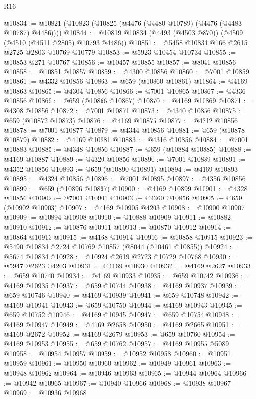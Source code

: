 \begin{lexlean}{R16}
\begin{coremodule}
@10834 := @10821 (@10823 (@10825 (@4476 (@4480 @10789) (@4476 (@4483 @10787) @4486))))
@10844 := @10819 @10834 (@4493 (@4503 @870)) (@4509 (@4510 (@4511 @2805) @10793 @4486))
@10851 := @5458 @10834 @166 @2615 @2725 @2803 @10769 @10779
@10853 := @5923 @10454 @10734
@10855 := @10853 @271 @10767
@10856 := @10457 @10855
@10857 := @8041 @10856
@10858 := @10851 @10857
@10859 := @4300 @10856
@10860 := @7001 @10859
@10861 := @4332 @10856
@10863 := @659 (@10860 @10861)
@10864 := @4169 @10863
@10865 := @4304 @10856
@10866 := @7001 @10865
@10867 := @4336 @10856
@10869 := @659 (@10866 @10867)
@10870 := @4169 @10869
@10871 := @4308 @10856
@10872 := @7001 @10871
@10873 := @4340 @10856
@10875 := @659 (@10872 @10873)
@10876 := @4169 @10875
@10877 := @4312 @10856
@10878 := @7001 @10877
@10879 := @4344 @10856
@10881 := @659 (@10878 @10879)
@10882 := @4169 @10881
@10883 := @4316 @10856
@10884 := @7001 @10883
@10885 := @4348 @10856
@10887 := @659 (@10884 @10885)
@10888 := @4169 @10887
@10889 := @4320 @10856
@10890 := @7001 @10889
@10891 := @4352 @10856
@10893 := @659 (@10890 @10891)
@10894 := @4169 @10893
@10895 := @4324 @10856
@10896 := @7001 @10895
@10897 := @4356 @10856
@10899 := @659 (@10896 @10897)
@10900 := @4169 @10899
@10901 := @4328 @10856
@10902 := @7001 @10901
@10903 := @4360 @10856
@10905 := @659 (@10902 @10903)
@10907 := @4169 @10905 @4203
@10908 := @10900 @10907
@10909 := @10894 @10908
@10910 := @10888 @10909
@10911 := @10882 @10910
@10912 := @10876 @10911
@10913 := @10870 @10912
@10914 := @10864 @10913
@10915 := @4168 @10914
@10916 := @10858 @10915
@10923 := @5490 @10834 @2724 @10769 @10857 (@8044 (@10461 @10855))
@10924 := @5674 @10834
@10928 := @10924 @2619 @2723 @10729 @10768
@10930 := @5947 @2623 @4203
@10931 := @4169 @10930
@10932 := @4169 @2627
@10933 := @659 @10740
@10934 := @4169 @10933
@10935 := @659 @10742
@10936 := @4169 @10935
@10937 := @659 @10744
@10938 := @4169 @10937
@10939 := @659 @10746
@10940 := @4169 @10939
@10941 := @659 @10748
@10942 := @4169 @10941
@10943 := @659 @10750
@10944 := @4169 @10943
@10945 := @659 @10752
@10946 := @4169 @10945
@10947 := @659 @10754
@10948 := @4169 @10947
@10949 := @4169 @2658
@10950 := @4169 @2665
@10951 := @4169 @2672
@10952 := @4169 @2679
@10953 := @659 @10760
@10954 := @4169 @10953
@10955 := @659 @10762
@10957 := @4169 @10955 @5089
@10958 := @10954 @10957
@10959 := @10952 @10958
@10960 := @10951 @10959
@10961 := @10950 @10960
@10962 := @10949 @10961
@10963 := @10948 @10962
@10964 := @10946 @10963
@10965 := @10944 @10964
@10966 := @10942 @10965
@10967 := @10940 @10966
@10968 := @10938 @10967
@10969 := @10936 @10968

\end{coremodule}
\end{lexlean}
